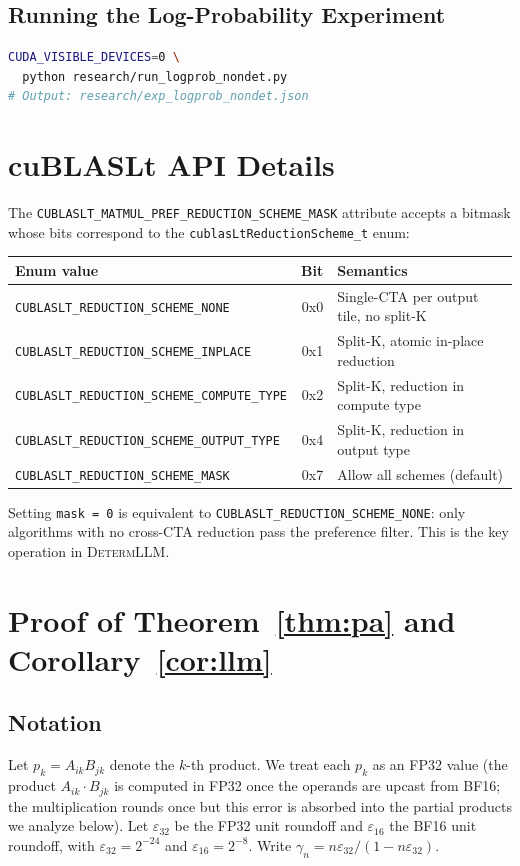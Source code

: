 \documentclass{article}
\newcommand{\dllm}{\textsc{DetermLLM}\xspace}
\begin{document}
\subsection{Running the Log-Probability Experiment}

\begin{lstlisting}[language=bash]
CUDA_VISIBLE_DEVICES=0 \
  python research/run_logprob_nondet.py
# Output: research/exp_logprob_nondet.json
\end{lstlisting}

\section{cuBLASLt API Details}
\label{app:api}

The \texttt{CUBLASLT\_MATMUL\_PREF\_REDUCTION\_SCHEME\_MASK} attribute accepts a
bitmask whose bits correspond to the \texttt{cublasLtReductionScheme\_t} enum:

\begin{center}
{\small
\begin{tabular}{lrl}
\toprule
Enum value & Bit & Semantics \\
\midrule
\texttt{CUBLASLT\_REDUCTION\_SCHEME\_NONE}         & 0x0 & Single-CTA per output tile, no split-K \\
\texttt{CUBLASLT\_REDUCTION\_SCHEME\_INPLACE}      & 0x1 & Split-K, atomic in-place reduction \\
\texttt{CUBLASLT\_REDUCTION\_SCHEME\_COMPUTE\_TYPE}& 0x2 & Split-K, reduction in compute type \\
\texttt{CUBLASLT\_REDUCTION\_SCHEME\_OUTPUT\_TYPE} & 0x4 & Split-K, reduction in output type \\
\texttt{CUBLASLT\_REDUCTION\_SCHEME\_MASK}         & 0x7 & Allow all schemes (default) \\
\bottomrule
\end{tabular}
}
\end{center}

Setting \texttt{mask = 0} is equivalent to \texttt{CUBLASLT\_REDUCTION\_SCHEME\_NONE}:
only algorithms with no cross-CTA reduction pass the preference filter.  This is the
key operation in \dllm.

\section{Proof of Theorem~\ref{thm:pa} and Corollary~\ref{cor:llm}}
\label{app:proof}

\subsection*{Notation}
Let $p_k\!=\!A_{ik}B_{jk}$ denote the $k$-th product. We treat each $p_k$ as an
FP32 value (the product $A_{ik}\cdot B_{jk}$ is computed in FP32 once the operands
are upcast from BF16; the multiplication rounds once but this error is absorbed into
the partial products we analyze below). Let $\varepsilon_{32}$ be the FP32 unit
roundoff and $\varepsilon_{16}$ the BF16 unit roundoff, with
$\varepsilon_{32}\!=\!2^{-24}$ and $\varepsilon_{16}\!=\!2^{-8}$. Write
$\gamma_n\!=\!n\varepsilon_{32}/(1-n\varepsilon_{32})$.
\end{document}
